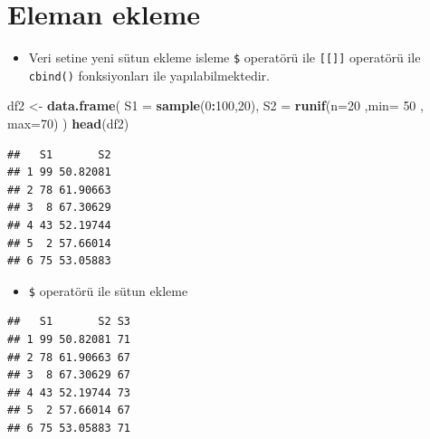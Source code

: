\documentclass[
  oneside]{book}
\newenvironment{Shaded}{\begin{snugshade}}{\end{snugshade}}
\newcommand{\AttributeTok}[1]{\textcolor[rgb]{0.13,0.29,0.53}{#1}}
\newcommand{\ConstantTok}[1]{\textcolor[rgb]{0.56,0.35,0.01}{#1}}
\newcommand{\DecValTok}[1]{\textcolor[rgb]{0.00,0.00,0.81}{#1}}
\newcommand{\FunctionTok}[1]{\textcolor[rgb]{0.13,0.29,0.53}{\textbf{#1}}}
\newcommand{\NormalTok}[1]{#1}
\newcommand{\OtherTok}[1]{\textcolor[rgb]{0.56,0.35,0.01}{#1}}
\newcommand{\SpecialCharTok}[1]{\textcolor[rgb]{0.81,0.36,0.00}{\textbf{#1}}}
\providecommand{\tightlist}{%
  \setlength{\itemsep}{0pt}\setlength{\parskip}{0pt}}
\begin{document}
\hypertarget{eleman-ekleme}{%
\section{Eleman ekleme}\label{eleman-ekleme}}

\begin{itemize}
\tightlist
\item
  Veri setine yeni sütun ekleme isleme \texttt{\$} operatörü ile \texttt{{[}{[}{]}{]}} operatörü ile \texttt{cbind()} fonksiyonları ile yapılabilmektedir.
\end{itemize}

\begin{Shaded}
\begin{Highlighting}[]
\NormalTok{df2 }\OtherTok{\textless{}{-}} \FunctionTok{data.frame}\NormalTok{(}
      \AttributeTok{S1 =} \FunctionTok{sample}\NormalTok{(}\DecValTok{0}\SpecialCharTok{:}\DecValTok{100}\NormalTok{,}\DecValTok{20}\NormalTok{),}
      \AttributeTok{S2 =} \FunctionTok{runif}\NormalTok{(}\AttributeTok{n=}\DecValTok{20}\NormalTok{ ,}\AttributeTok{min=} \DecValTok{50}\NormalTok{ , }\AttributeTok{max=}\DecValTok{70}\NormalTok{)}
\NormalTok{)}
\FunctionTok{head}\NormalTok{(df2)}
\end{Highlighting}
\end{Shaded}

\begin{verbatim}
##   S1       S2
## 1 99 50.82081
## 2 78 61.90663
## 3  8 67.30629
## 4 43 52.19744
## 5  2 57.66014
## 6 75 53.05883
\end{verbatim}

\begin{itemize}
\tightlist
\item
  \texttt{\$} operatörü ile sütun ekleme
\end{itemize}

\begin{Shaded}
\end{Shaded}

\begin{verbatim}
##   S1       S2 S3
## 1 99 50.82081 71
## 2 78 61.90663 67
## 3  8 67.30629 67
## 4 43 52.19744 73
## 5  2 57.66014 67
## 6 75 53.05883 71
\end{verbatim}
\end{document}
